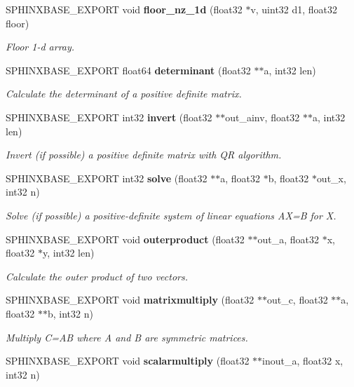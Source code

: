 \begin{DoxyCompactItemize}
S\+P\+H\+I\+N\+X\+B\+A\+S\+E\+\_\+\+E\+X\+P\+O\+RT void \textbf{ floor\+\_\+nz\+\_\+1d} (float32 $\ast$v, uint32 d1, float32 floor)
\begin{DoxyCompactList}\small\item\em Floor 1-\/d array. \end{DoxyCompactList}\item 
S\+P\+H\+I\+N\+X\+B\+A\+S\+E\+\_\+\+E\+X\+P\+O\+RT float64 \textbf{ determinant} (float32 $\ast$$\ast$a, int32 len)
\begin{DoxyCompactList}\small\item\em Calculate the determinant of a positive definite matrix. \end{DoxyCompactList}\item 
S\+P\+H\+I\+N\+X\+B\+A\+S\+E\+\_\+\+E\+X\+P\+O\+RT int32 \textbf{ invert} (float32 $\ast$$\ast$out\+\_\+ainv, float32 $\ast$$\ast$a, int32 len)
\begin{DoxyCompactList}\small\item\em Invert (if possible) a positive definite matrix with QR algorithm. \end{DoxyCompactList}\item 
S\+P\+H\+I\+N\+X\+B\+A\+S\+E\+\_\+\+E\+X\+P\+O\+RT int32 \textbf{ solve} (float32 $\ast$$\ast$a, float32 $\ast$b, float32 $\ast$out\+\_\+x, int32 n)
\begin{DoxyCompactList}\small\item\em Solve (if possible) a positive-\/definite system of linear equations AX=B for X. \end{DoxyCompactList}\item 
S\+P\+H\+I\+N\+X\+B\+A\+S\+E\+\_\+\+E\+X\+P\+O\+RT void \textbf{ outerproduct} (float32 $\ast$$\ast$out\+\_\+a, float32 $\ast$x, float32 $\ast$y, int32 len)
\begin{DoxyCompactList}\small\item\em Calculate the outer product of two vectors. \end{DoxyCompactList}\item 
S\+P\+H\+I\+N\+X\+B\+A\+S\+E\+\_\+\+E\+X\+P\+O\+RT void \textbf{ matrixmultiply} (float32 $\ast$$\ast$out\+\_\+c, float32 $\ast$$\ast$a, float32 $\ast$$\ast$b, int32 n)
\begin{DoxyCompactList}\small\item\em Multiply C=AB where A and B are symmetric matrices. \end{DoxyCompactList}\item 
S\+P\+H\+I\+N\+X\+B\+A\+S\+E\+\_\+\+E\+X\+P\+O\+RT void \textbf{ scalarmultiply} (float32 $\ast$$\ast$inout\+\_\+a, float32 x, int32 n)
$$
\end{DoxyCompactItemize}
